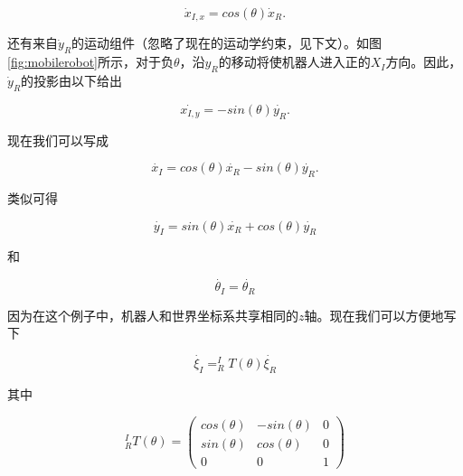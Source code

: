 \begin{equation}
\dot{x}_{I,x}=cos(\theta) \dot{x}_R.
\end{equation}


还有来自$\dot{y}_R$的运动组件（忽略了现在的运动学约束，见下文）。如图\ref{fig:mobilerobot}所示，对于负$\theta$，沿$y_R$的移动将使机器人进入正的$X_I$方向。因此，$\dot{y}_R$的投影由以下给出

\begin{equation}
\dot{x_{I,y}}=-sin(\theta)\dot{y_R}.
\end{equation} 

现在我们可以写成

\begin{equation}
\dot{x_I}=cos(\theta) \dot{x_R} - sin(\theta) \dot{y_R}.
\end{equation}

类似可得

\begin{equation}
\dot{y_I}=sin(\theta) \dot{x_R} + cos(\theta) \dot{y_R}
\end{equation}

和

\begin{equation}
\dot{\theta_I}=\dot{\theta_R}
\end{equation}

因为在这个例子中，机器人和世界坐标系共享相同的$z$轴。现在我们可以方便地写下

\begin{equation}
\dot{\xi_I}=^I_RT(\theta)\dot{\xi_R}
\end{equation}

其中

\begin{equation}
^I_RT(\theta)=\left(\begin{array}{ccc}
cos(\theta) & -sin(\theta) & 0 \\
sin(\theta) & cos(\theta) & 0 \\
0 & 0 & 1\end{array}\right)
\end{equation}

